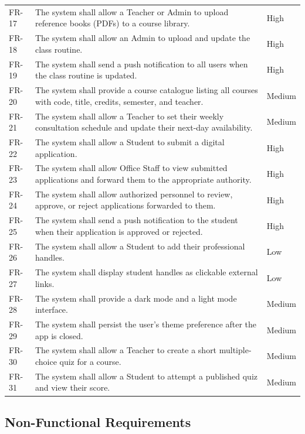 \documentclass[12pt,a4paper]{article}
\begin{document}
\begin{longtable}{|>{\centering\arraybackslash}p{2cm}|p{10cm}|>{\centering\arraybackslash}p{2cm}|}
FR-17 & The system shall allow a Teacher or Admin to upload reference books (PDFs) to a course library. & High \\
FR-18 & The system shall allow an Admin to upload and update the class routine. & High \\
FR-19 & The system shall send a push notification to all users when the class routine is updated. & High \\
FR-20 & The system shall provide a course catalogue listing all courses with code, title, credits, semester, and teacher. & Medium \\
FR-21 & The system shall allow a Teacher to set their weekly consultation schedule and update their next-day availability. & Medium \\
FR-22 & The system shall allow a Student to submit a digital application. & High \\
FR-23 & The system shall allow Office Staff to view submitted applications and forward them to the appropriate authority. & High \\
FR-24 & The system shall allow authorized personnel to review, approve, or reject applications forwarded to them. & High \\
FR-25 & The system shall send a push notification to the student when their application is approved or rejected. & High \\
FR-26 & The system shall allow a Student to add their professional handles. & Low \\
FR-27 & The system shall display student handles as clickable external links. & Low \\
FR-28 & The system shall provide a dark mode and a light mode interface. & Medium \\
FR-29 & The system shall persist the user's theme preference after the app is closed. & Medium \\
FR-30 & The system shall allow a Teacher to create a short multiple-choice quiz for a course. & Medium \\
FR-31 & The system shall allow a Student to attempt a published quiz and view their score. & Medium \\
\hline
\end{longtable}

\subsection{Non-Functional Requirements}
\end{document}
